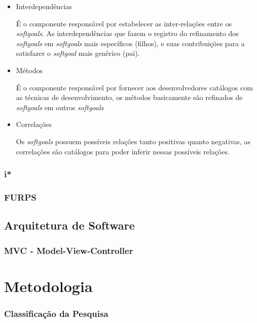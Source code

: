 \begin{itemize}
	\item Interdependências
	
	É o componente responsável por estabelecer as inter-relações entre os \textit{softgoals}. As interdependências que fazem o registro do refinamento dos \textit{softgoals} em \textit{softgoals} mais específicos (filhos), e suas contribuições para a satisfazer o \textit{softgoal} mais genêrico (pai).  

	\item Métodos
	
	É o componente responsável por fornecer aos desenvolvedores catálogos com as técnicas de desenvolvimento, os métodos basicamente são refinados de \textit{softgoals} em outros \textit{softgoals}
	
	\item Correlações
	
	Os \textit{softgoals} possuem possíveis relações tanto positivas quanto negativas, as correlações são catálogos para poder inferir nessas possíveis relações. 
\end{itemize}

\subsection{i*}

\subsection{FURPS}


\section{Arquitetura de Software}

\subsection{MVC - Model-View-Controller}

\chapter{Metodologia}

\subsection{Classificação da Pesquisa}
